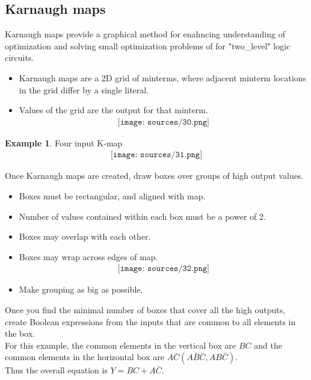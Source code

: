 \documentclass[12pt]{article}
\theoremstyle{definition}
\newtheorem{example}{Example}[section]
\begin{document}
\subsection{Karnaugh maps}
Karnaugh maps provide a graphical method for enahncing understanding of optimization and solving small optimization problems of for "two_level" logic circuits.
\begin{itemize}
    \item Karnaugh maps are a 2D grid of minterms, where adjacent minterm locations in the grid differ by a single literal.
    \item Values of the grid are the output for that minterm. \begin{align*}
        \texttt{[image: sources/30.png]}
    \end{align*}
\end{itemize}
\begin{example}
    Four input K-map
    \begin{align*}
        \texttt{[image: sources/31.png]}
    \end{align*}
\end{example}
Once Karnaugh maps are created, draw boxes over groups of high output values.
\begin{itemize}
    \item Boxes must be rectangular, and aligned with map.
    \item Number of values contained within each box must be a power of 2.
    \item Boxes may overlap with each other.
    \item Boxes may wrap across edges of map.\begin{align*}
        \texttt{[image: sources/32.png]}
    \end{align*}
    \item Make grouping as big as possible.
\end{itemize}
Once you find the minimal number of boxes that cover all the high outputs, create Boolean expressions from the inputs that are common to all elements in the box.\\
For this example, the common elements in the vertical box are $BC$ and the common elements in the horizontal box are $A\bar{C} (A\bar{B}\bar{C}, AB\bar{C})$.\\
Thus the overall equation is $Y=BC+A\bar{C}$.
\end{document}
